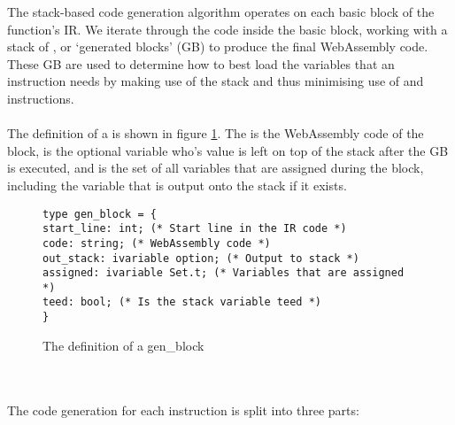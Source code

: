 The stack-based code generation algorithm operates on each basic block of the function's IR. We iterate through the code inside the basic block, working with a stack of , or `generated blocks' (GB) to produce the final WebAssembly code. These GB are used to determine how to best load the variables that an instruction needs by making use of the stack and thus minimising use of  and  instructions.
\\\\
The definition of a  is shown in figure \ref{fig:genblock}. The  is the WebAssembly code of the block,  is the optional variable who's value is left on top of the stack after the GB is executed, and  is the set of all variables that are assigned during the block, including the variable that is output onto the stack if it exists.
\begin{figure}[h]
\begin{verbatim}
type gen_block = {
start_line: int; (* Start line in the IR code *)
code: string; (* WebAssembly code *)
out_stack: ivariable option; (* Output to stack *)
assigned: ivariable Set.t; (* Variables that are assigned *)
teed: bool; (* Is the stack variable teed *)
}
\end{verbatim}
\caption{The definition of a gen\_block}
\label{fig:genblock}
\end{figure}
\\\\
The code generation for each instruction is split into three parts:
